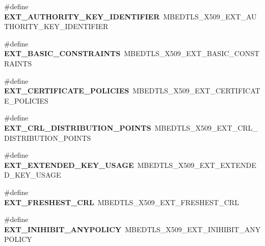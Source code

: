 \begin{DoxyCompactItemize}
\#define {\bfseries E\+X\+T\+\_\+\+A\+U\+T\+H\+O\+R\+I\+T\+Y\+\_\+\+K\+E\+Y\+\_\+\+I\+D\+E\+N\+T\+I\+F\+I\+ER}~M\+B\+E\+D\+T\+L\+S\+\_\+\+X509\+\_\+\+E\+X\+T\+\_\+\+A\+U\+T\+H\+O\+R\+I\+T\+Y\+\_\+\+K\+E\+Y\+\_\+\+I\+D\+E\+N\+T\+I\+F\+I\+ER
\item 
\mbox{\label{compat-1_83_8h_a7813d9ed1f4ee1f122782d31f459d989}} 
\#define {\bfseries E\+X\+T\+\_\+\+B\+A\+S\+I\+C\+\_\+\+C\+O\+N\+S\+T\+R\+A\+I\+N\+TS}~M\+B\+E\+D\+T\+L\+S\+\_\+\+X509\+\_\+\+E\+X\+T\+\_\+\+B\+A\+S\+I\+C\+\_\+\+C\+O\+N\+S\+T\+R\+A\+I\+N\+TS
\item 
\mbox{\label{compat-1_83_8h_a89bed13c425f192607aac9712adc5655}} 
\#define {\bfseries E\+X\+T\+\_\+\+C\+E\+R\+T\+I\+F\+I\+C\+A\+T\+E\+\_\+\+P\+O\+L\+I\+C\+I\+ES}~M\+B\+E\+D\+T\+L\+S\+\_\+\+X509\+\_\+\+E\+X\+T\+\_\+\+C\+E\+R\+T\+I\+F\+I\+C\+A\+T\+E\+\_\+\+P\+O\+L\+I\+C\+I\+ES
\item 
\mbox{\label{compat-1_83_8h_a00ae4f8608f1369a993c14a09909254e}} 
\#define {\bfseries E\+X\+T\+\_\+\+C\+R\+L\+\_\+\+D\+I\+S\+T\+R\+I\+B\+U\+T\+I\+O\+N\+\_\+\+P\+O\+I\+N\+TS}~M\+B\+E\+D\+T\+L\+S\+\_\+\+X509\+\_\+\+E\+X\+T\+\_\+\+C\+R\+L\+\_\+\+D\+I\+S\+T\+R\+I\+B\+U\+T\+I\+O\+N\+\_\+\+P\+O\+I\+N\+TS
\item 
\mbox{\label{compat-1_83_8h_a97bef6a8c3abaf7755b95d997f9af98e}} 
\#define {\bfseries E\+X\+T\+\_\+\+E\+X\+T\+E\+N\+D\+E\+D\+\_\+\+K\+E\+Y\+\_\+\+U\+S\+A\+GE}~M\+B\+E\+D\+T\+L\+S\+\_\+\+X509\+\_\+\+E\+X\+T\+\_\+\+E\+X\+T\+E\+N\+D\+E\+D\+\_\+\+K\+E\+Y\+\_\+\+U\+S\+A\+GE
\item 
\mbox{\label{compat-1_83_8h_a789934a5dcd8b306a887e4b1445e4fcc}} 
\#define {\bfseries E\+X\+T\+\_\+\+F\+R\+E\+S\+H\+E\+S\+T\+\_\+\+C\+RL}~M\+B\+E\+D\+T\+L\+S\+\_\+\+X509\+\_\+\+E\+X\+T\+\_\+\+F\+R\+E\+S\+H\+E\+S\+T\+\_\+\+C\+RL
\item 
\mbox{\label{compat-1_83_8h_a0b7304f4fdd5fa11b58018cffabe1d98}} 
\#define {\bfseries E\+X\+T\+\_\+\+I\+N\+I\+H\+I\+B\+I\+T\+\_\+\+A\+N\+Y\+P\+O\+L\+I\+CY}~M\+B\+E\+D\+T\+L\+S\+\_\+\+X509\+\_\+\+E\+X\+T\+\_\+\+I\+N\+I\+H\+I\+B\+I\+T\+\_\+\+A\+N\+Y\+P\+O\+L\+I\+CY
\item 
\mbox{\label{compat-1_83_8h_a1e3ae3cafc339ef7ac83aa01b7aec3b1}} 

\end{DoxyCompactItemize}
